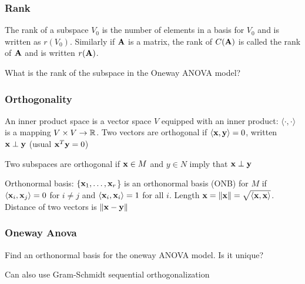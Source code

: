 \documentclass{beamer}
\begin{document}
\begin{frame} \frametitle{Rank}
  \begin{definition}
    The rank of a subspace $V_0$ is the number of elements in a basis
    for $V_0$ and is written as $r(V_0)$.  Similarly if $\mathbf{A}$ is a
    matrix, the rank of $C(\mathbf{A})$ is called the rank of $\mathbf{A}$ and is
    written $r(\mathbf{A})$.
  \end{definition} \pause
What is the rank of the subspace in the Oneway ANOVA model?
\end{frame}
\begin{frame}
  \frametitle{Orthogonality}
  \begin{definition}
An inner product space is a vector space $V$ equipped with an inner product: $\langle
\cdot, \cdot \rangle$ is a mapping $V \times V \rightarrow \mathbb{R}$.  Two vectors are orthogonal if $\langle \mathbf{x}, \mathbf{y}
    \rangle = 0$, written $\mathbf{x} \perp \mathbf{y}$ \pause   (usual $\mathbf{x}^T\mathbf{y} = 0$)
  \end{definition}
  \begin{definition}
    Two subspaces are orthogonal if $\mathbf{x} \in M$  and $y \in N$ imply
    that $\mathbf{x} \perp \mathbf{y}$ \pause
  \end{definition}
  \begin{definition}
    Orthonormal basis:  $\{\mathbf{x}_1, \ldots, \mathbf{x}_r$\} is an orthonormal
    basis  (ONB) for $M$ if $\langle \mathbf{x}_i, \mathbf{x}_j \rangle = 0$ for $i \neq j$ and
    $\langle \mathbf{x}_i, \mathbf{x}_i \rangle = 1$ for all $i$.  Length $\mathbf{x} = \|
    \mathbf{x} \| = \sqrt{\langle\mathbf{x}, \mathbf{x} \rangle}$.  Distance of two vectors is 
$\| \mathbf{x} - \mathbf{y} \|$
  \end{definition}
\end{frame}
\begin{frame} \frametitle{Oneway Anova}
  Find an orthonormal basis for the oneway ANOVA model.  Is it unique?
  \pause

\vspace{2in}
Can also use Gram-Schmidt sequential orthogonalization
\end{frame}
\end{document}
